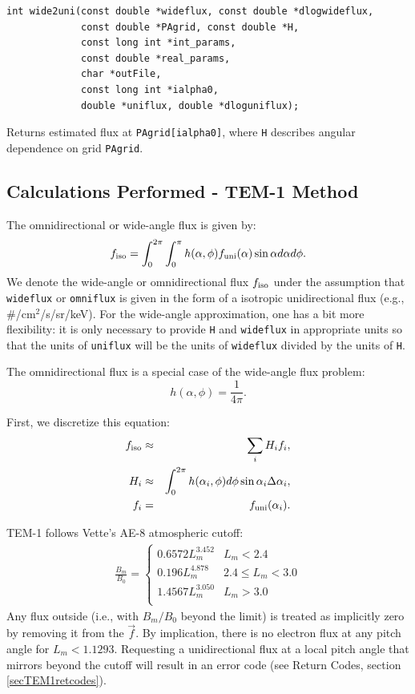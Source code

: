 \documentclass{article}    %
\begin{document}
\begin{verbatim}
int wide2uni(const double *wideflux, const double *dlogwideflux,
             const double *PAgrid, const double *H, 
             const long int *int_params, 
             const double *real_params,
             char *outFile,
             const long int *ialpha0,
             double *uniflux, double *dloguniflux);
\end{verbatim}
Returns estimated flux at \verb|PAgrid[ialpha0]|, where \verb|H|
describes angular dependence on grid \verb|PAgrid|.

\subsection{Calculations Performed - TEM-1 Method}

The omnidirectional or wide-angle flux is given by:
\begin{equation}
f_{\rm iso} = \int_0^{2\pi} \int_0^{\pi} h(\alpha,\phi) f_{\rm uni}(\alpha) \sin\alpha d\alpha d\phi.
\end{equation}
We denote the wide-angle or omnidirectional flux $f_{\rm iso}$ under
the assumption that \verb|wideflux| or \verb|omniflux| is given in
the form of a isotropic unidirectional flux (e.g., \#/cm$^2$/s/sr/keV).
For the wide-angle approximation, one has a bit more flexibility: it
is only necessary to provide \verb|H| and \verb|wideflux| in
appropriate units so that the units of \verb|uniflux| will be the
units of \verb|wideflux| divided by the units of \verb|H|.

The omnidirectional flux is a special case of the wide-angle flux problem:
\begin{equation}
h(\alpha,\phi) = \frac{1}{4\pi}.
\end{equation}

First, we discretize this equation:
\begin{eqnarray}
f_{\rm iso} &\approx& \sum_i H_i f_i, \\ 
H_i &\approx& \int_0^{2\pi} h(\alpha_i,\phi) d\phi \sin\alpha_i \Delta\alpha_i, \\
f_i &=& f_{\rm uni}(\alpha_i).
\end{eqnarray}

TEM-1 follows Vette's AE-8 atmospheric cutoff:
\begin{eqnarray}
\frac{B_m}{B_0} = \left\{
\begin{array}{cl}
0.6572 L_m^{3.452} & L_m < 2.4 \\
0.196 L_m^{4.878} & 2.4 \le L_m < 3.0 \\
1.4567 L_m^{3.050} & L_m >3.0 \\
\end{array}
\right.
\end{eqnarray}
Any flux outside (i.e., with $B_m/B_0$ beyond the limit) is treated as
implicitly zero by removing it from the $\vec{f}$.  By implication,
there is no electron flux at any pitch angle for $L_m < 1.1293$.
Requesting a unidirectional flux at a local pitch angle that mirrors
beyond the cutoff will result in an error code (see Return Codes,
section \ref{secTEM1retcodes}).
\end{document}
